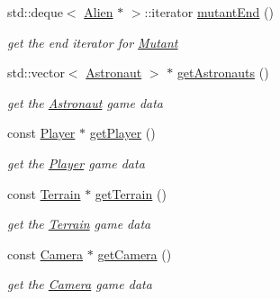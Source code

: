 \begin{DoxyCompactItemize}
\mbox{\label{class_alien_manager_ade814cb64a409e7bd2f88be5be159b16}} 
std\+::deque$<$ \hyperlink{class_alien}{Alien} $\ast$ $>$\+::iterator \hyperlink{class_alien_manager_ade814cb64a409e7bd2f88be5be159b16}{mutant\+End} ()
\begin{DoxyCompactList}\small\item\em get the end iterator for \hyperlink{class_mutant}{Mutant} \end{DoxyCompactList}\item 
\mbox{\label{class_alien_manager_a0a2ffae7f5a87d94401b0a0375c02dcd}} 
std\+::vector$<$ \hyperlink{class_astronaut}{Astronaut} $>$ $\ast$ \hyperlink{class_alien_manager_a0a2ffae7f5a87d94401b0a0375c02dcd}{get\+Astronauts} ()
\begin{DoxyCompactList}\small\item\em get the \hyperlink{class_astronaut}{Astronaut} game data \end{DoxyCompactList}\item 
\mbox{\label{class_alien_manager_a40c5a7ffc4c38f3c970f63936a87ccd8}} 
const \hyperlink{class_player}{Player} $\ast$ \hyperlink{class_alien_manager_a40c5a7ffc4c38f3c970f63936a87ccd8}{get\+Player} ()
\begin{DoxyCompactList}\small\item\em get the \hyperlink{class_player}{Player} game data \end{DoxyCompactList}\item 
\mbox{\label{class_alien_manager_a5c6478a22609ee2f69a754a3e20c5cc4}} 
const \hyperlink{class_terrain}{Terrain} $\ast$ \hyperlink{class_alien_manager_a5c6478a22609ee2f69a754a3e20c5cc4}{get\+Terrain} ()
\begin{DoxyCompactList}\small\item\em get the \hyperlink{class_terrain}{Terrain} game data \end{DoxyCompactList}\item 
\mbox{\label{class_alien_manager_aeaf8bdda166e1db2b0694447e467820c}} 
const \hyperlink{class_camera}{Camera} $\ast$ \hyperlink{class_alien_manager_aeaf8bdda166e1db2b0694447e467820c}{get\+Camera} ()
\begin{DoxyCompactList}\small\item\em get the \hyperlink{class_camera}{Camera} game data \end{DoxyCompactList}\item 

\end{DoxyCompactItemize}
